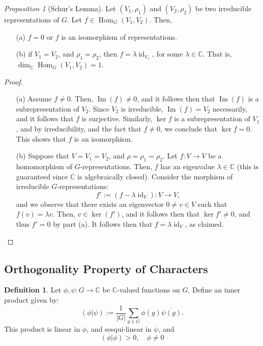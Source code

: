 \documentclass[a4paper]{report}
\theoremstyle{definition}
\newtheorem{definition}{Definition}
\theoremstyle{remark}
\theoremstyle{proposition}
\newtheorem{proposition}{Proposition}
\theoremstyle{conjecture}
\theoremstyle{lemma}
\theoremstyle{corollary}
\theoremstyle{exercise}
\theoremstyle{example}
\newcommand{\C}{\mathbb{C}}
\newcommand{\on}{\operatorname}
\begin{document}
\begin{proposition}[Schur's Lemma]\label{prop_schurs_lemma}
    Let $(V_1,\rho_1)$ and $(V_2,\rho_2)$ be two irreducible representations of 
    $G$. Let $f \in \on{Hom}_G(V_1,V_2)$. Then, 
    \begin{itemize}
        \item[(a)] $f =0$ or $f$ is an isomorphism of representations.
        \item[(b)] if $V_1=V_2$, and $\rho_1=\rho_2$, then 
            $f =\lambda \on{id}_{V_1}$, for some $\lambda \in \C$.
            That is, $\dim_\C \on{Hom}_G(V_1,V_2) = 1$.
    \end{itemize}
\end{proposition}
\begin{proof}
    \leavevmode
    \begin{itemize}
        \item[(a)] Assume $f\neq 0$. Then, $\on{Im}(f) \neq 0$, and it 
            follows then that $\on{Im}(f)$ is a subrepresentation of $V_2$.
            Since $V_2$ is irreducible, $\on{Im}(f) = V_2$ necessarily, and 
            it follows that $f$ is surjective. Similarly, $\ker f$ is a 
            subrepresentation of $V_1$, and by irreducibility, and the fact
             that $f\neq 0$, we conclude that $\ker f = 0$. This shows that 
             $f$ is an isomorphism. 
         \item[(b)] Suppose that $V=V_1=V_2$, and $\rho=\rho_1=\rho_2$. 
             Let $f : V \to V$ be a homomorphism of $G$-representations. 
             Then, $f$ has an eigenvalue $\lambda \in \C$ (this is guaranteed 
             since $\C$ is algebraically closed). Consider the morphism of 
             irreducible $G$-representations:
             $$f' := (f-\lambda \on{id}_V):  V\to V,$$
             and we observe that there exists an eigenvector $0\neq v\in V$
             such that $f(v) = \lambda v$. Then, $v \in \ker (f')$,
             and it follows then that $\ker f' \neq 0$, and thus $f'=0$
             by part (a). It follows then that $f = \lambda \on{id}_V$,
             as claimed. 
    \end{itemize}
\end{proof}

\subsection{Orthogonality Property of Characters}

\begin{definition}
    Let $\phi,\psi : G \to \C$ be $\C$-valued functions on $G$. Define 
    an inner product given by:
    $$(\phi\vert\psi) := \frac{1}{\vert G \vert} \sum_{g\in G} \phi(g)\overline{\psi(g)}.$$
    This product is linear in $\phi$, and sesqui-linear in $\psi$, and 
    $$(\phi\vert\phi) > 0, \quad \phi\neq 0$$
\end{definition}
\end{document}
